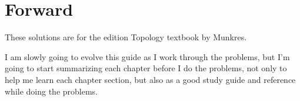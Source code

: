 \documentclass[titlepage]{book}
\begin{document}
\maketitle

\frontmatter
\tableofcontents

\chapter*{Forward}

These solutions are for the  edition Topology textbook by Munkres.

I am slowly going to evolve this guide as I work through the problems, but I'm
going to start summarizing each chapter before I do the problems, not only to
help me learn each chapter section, but also as a good study guide and reference
while doing the problems.

\mainmatter

\end{document}
